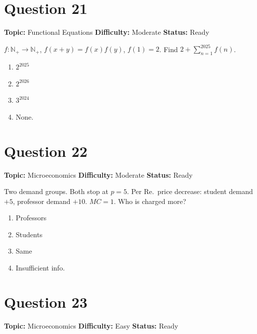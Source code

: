 \documentclass[11pt]{article}
\begin{document}
\newpage

\section*{Question 21}


\noindent\textbf{Topic:} Functional Equations \quad \textbf{Difficulty:} Moderate \quad \textbf{Status:} Ready



$f : \mathbb{N}_+ \to \mathbb{N}_+$, $f(x+y) = f(x) f(y)$, $f(1) = 2$. Find $2 + \sum_{n=1}^{2025} f(n)$.
\begin{enumerate}[label=(\Alph*)]
\item $2^{2025}$ \item $2^{2026}$ \item $3^{2024}$ \item None.
\end{enumerate}

\newpage

\section*{Question 22}


\noindent\textbf{Topic:} Microeconomics \quad \textbf{Difficulty:} Moderate \quad \textbf{Status:} Ready



Two demand groups. Both stop at $p = 5$. Per Re.\ price decrease: student demand $+5$, professor demand $+10$. $MC = 1$. Who is charged more?

\begin{enumerate}[label=(\Alph*)]
\item Professors \item Students \item Same \item Insufficient info.
\end{enumerate}

\newpage

\section*{Question 23}


\noindent\textbf{Topic:} Microeconomics \quad \textbf{Difficulty:} Easy \quad \textbf{Status:} Ready
\end{document}
